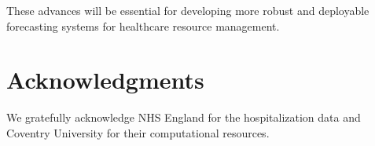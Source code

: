 \documentclass[lettersize, journal]{IEEEtran}
\begin{document}
These advances will be essential for developing more robust and deployable forecasting systems for healthcare resource management.

\section*{Acknowledgments}
We gratefully acknowledge NHS England for the hospitalization data and Coventry University for their computational resources.



\end{document}
